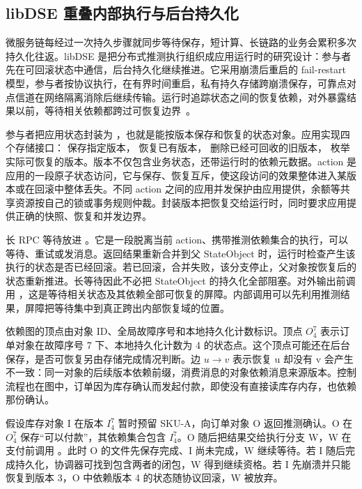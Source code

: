 \subsection{libDSE 重叠内部执行与后台持久化}

微服务链每经过一次持久步骤就同步等待保存，短计算、长链路的业务会累积多次持久化往返。libDSE 是把分布式推测执行组织成应用运行时的研究设计：参与者先在可回滚状态中通信，后台持久化继续推进。它采用崩溃后重启的 fail-restart 模型，参与者按协议执行，在有界时间重启，私有持久存储跨崩溃保存，可靠点对点信道在网络隔离消除后继续传输。运行时追踪状态之间的恢复依赖，对外暴露结果以前，等待相关依赖都跨过可恢复边界~\cite{ch21-libdse}。

参与者把应用状态封装为 ，也就是能按版本保存和恢复的状态对象。应用实现四个存储接口： 保存指定版本， 恢复已有版本， 删除已经可回收的旧版本， 枚举实际可恢复的版本。版本不仅包含业务状态，还带运行时的依赖元数据。action 是应用的一段原子状态访问，它与保存、恢复互斥，使这段访问的效果整体进入某版本或在回滚中整体丢失。不同 action 之间的应用并发保护由应用提供，余额等共享资源按自己的锁或事务规则仲裁。封装版本把恢复交给运行时，同时要求应用提供正确的快照、恢复和并发边界。

长 RPC 等待放进 。它是一段脱离当前 action、携带推测依赖集合的执行，可以等待、重试或发消息。返回结果重新合并到父 StateObject 时，运行时检查产生该执行的状态是否已经回滚。若已回滚，合并失败，该分支停止，父对象按恢复后的状态重新推进。长等待因此不必把 StateObject 的持久化全部阻塞。对外输出前调用 ，这是等待相关状态及其依赖全部可恢复的屏障。内部调用可以先利用推测结果，屏障把等待集中到真正跨出内部恢复域的位置。


依赖图的顶点由对象 ID、全局故障序号和本地持久化计数标识。顶点 $O^7_4$ 表示订单对象在故障序号 7 下、本地持久化计数为 4 的状态点。这个顶点可能还在后台保存，是否可恢复另由存储完成情况判断。边 $u\rightarrow v$ 表示恢复 u 却没有 v 会产生不一致：同一对象的后续版本依赖前缀，消费消息的对象依赖消息来源版本。控制流程也在图中，订单因为库存确认而发起付款，即使没有直接读库存内存，也依赖那份确认。

假设库存对象 I 在版本 $I^7_4$ 暂时预留 SKU-A，向订单对象 O 返回推测确认。O 在 $O^7_4$ 保存“可以付款”，其依赖集合包含 $I^7_4$。O 随后把结果交给执行分支 W，W 在支付前调用 。此时 O 的文件先保存完成、I 尚未完成，W 继续等待。若 I 随后完成持久化，协调器可找到包含两者的闭包，W 得到继续资格。若 I 先崩溃并只能恢复到版本 3，O 中依赖版本 4 的状态随协议回滚，W 被放弃。

